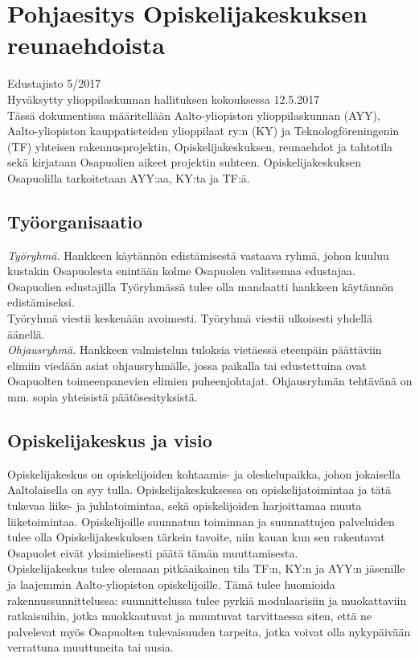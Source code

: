 \documentclass[a4paper, 12pt, finnish]{report}
\begin{document}
\chapter{Pohjaesitys Opiskelijakeskuksen reunaehdoista}
Edustajisto 5/2017\\
Hyväksytty ylioppilaskunnan hallituksen kokouksessa 12.5.2017\\

Tässä dokumentissa määritellään Aalto-yliopiston ylioppilaskunnan (AYY), Aalto-yliopiston kauppatieteiden ylioppilaat ry:n (KY) ja Teknologföreningenin (TF) yhteisen rakennusprojektin, Opiskelijakeskuksen, reunaehdot ja tahtotila sekä kirjataan Osapuolien aikeet projektin suhteen.
Opiskelijakeskuksen Osapuolilla tarkoitetaan AYY:aa, KY:ta ja TF:ä.


\section*{Työorganisaatio}
\textit{Työryhmä.} Hankkeen käytännön edistämisestä vastaava ryhmä, johon kuuluu kustakin Osapuolesta enintään kolme Osapuolen valitsemaa edustajaa.
Osapuolien edustajilla Työryhmässä tulee olla mandaatti hankkeen käytännön edistämiseksi.\\

Työryhmä viestii keskenään avoimesti. Työryhmä viestii ulkoisesti yhdellä äänellä.\\

\textit{Ohjausryhmä.} Hankkeen valmistelun tuloksia vietäessä eteenpäin päättäviin elimiin viedään asiat ohjausryhmälle, jossa paikalla tai edustettuina ovat Osapuolten toimeenpanevien elimien puheenjohtajat.
Ohjausryhmän tehtävänä on mm. sopia yhteisistä päätösesityksistä.

\section*{Opiskelijakeskus ja visio}
Opiskelijakeskus on opiskelijoiden kohtaamis- ja oleskelupaikka, johon jokaisella Aaltolaisella on syy tulla.
Opiskelijakeskuksessa on opiskelijatoimintaa ja tätä tukevaa liike- ja juhlatoimintaa, sekä opiskelijoiden harjoittamaa muuta liiketoimintaa.
Opiskelijoille suunnatun toiminnan ja suunnattujen palveluiden tulee olla Opiskelijakeskuksen tärkein tavoite, niin kauan kun sen rakentavat Osapuolet eivät yksimielisesti päätä tämän muuttamisesta.\\

Opiskelijakeskus tulee olemaan pitkäaikainen tila TF:n, KY:n ja AYY:n jäsenille ja laajemmin Aalto-yliopiston opiskelijoille.
Tämä tulee huomioida rakennussunnittelussa: suunnittelussa tulee pyrkiä modulaarisiin ja muokattaviin ratkaisuihin, jotka muokkautuvat ja muuntuvat tarvittaessa siten, että ne palvelevat myös Osapuolten tulevaisuuden tarpeita, jotka voivat olla nykypäivään verrattuna muuttuneita tai uusia.\\
\end{document}
